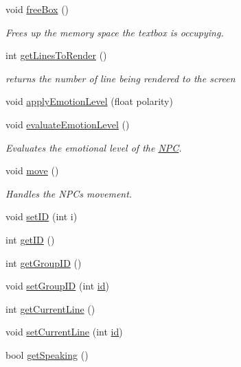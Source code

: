 \begin{DoxyCompactItemize}
void \hyperlink{class_n_p_c_abacec0f0add55305f86ad56e4c80cd18}{free\+Box} ()
\begin{DoxyCompactList}\small\item\em Frees up the memory space the textbox is occupying. \end{DoxyCompactList}\item 
int \hyperlink{class_n_p_c_a64425a9a6a4b6262e4f9e0a4e5169ce4}{get\+Lines\+To\+Render} ()
\begin{DoxyCompactList}\small\item\em returns the number of line being rendered to the screen \end{DoxyCompactList}\item 
void \hyperlink{class_n_p_c_a3cb8421a139170f47247b1e126eb722b}{apply\+Emotion\+Level} (float polarity)
\item 
void \hyperlink{class_n_p_c_a278f18152374a82602f57f98c0a43800}{evaluate\+Emotion\+Level} ()
\begin{DoxyCompactList}\small\item\em Evaluates the emotional level of the \hyperlink{class_n_p_c}{N\+PC}. \end{DoxyCompactList}\item 
void \hyperlink{class_n_p_c_abaa15a4fd5a37a62983d7fd2acafe271}{move} ()
\begin{DoxyCompactList}\small\item\em Handles the N\+P\+Cs movement. \end{DoxyCompactList}\item 
void \hyperlink{class_n_p_c_a81d67fe2002ad57334c40fadcba25dc4}{set\+ID} (int i)
\item 
int \hyperlink{class_n_p_c_ac4588139be32c307a0d31e302f377dea}{get\+ID} ()
\item 
int \hyperlink{class_n_p_c_a7ea10930901666fc087de1a74d339b84}{get\+Group\+ID} ()
\item 
void \hyperlink{class_n_p_c_aaa89e6f11f1bda185769ae321f345960}{set\+Group\+ID} (int \hyperlink{class_n_p_c_a1b705223f885df652f2faffc4735d03c}{id})
\item 
int \hyperlink{class_n_p_c_a83d65db3ffe79025091a655d92fe4f27}{get\+Current\+Line} ()
\item 
void \hyperlink{class_n_p_c_ac2143e6bbc303d3fbe65c5603746557e}{set\+Current\+Line} (int \hyperlink{class_n_p_c_a1b705223f885df652f2faffc4735d03c}{id})
\item 
bool \hyperlink{class_n_p_c_a759c42c8f2a75d2684157574cf3ddc65}{get\+Speaking} ()
\item 

\end{DoxyCompactItemize}

